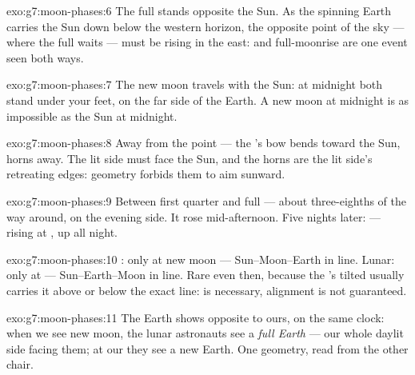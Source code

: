 \begin{solution}{exo:g7:moon-phases:6}
The full  stands opposite the Sun. As the spinning Earth
carries the Sun down below the western horizon, the opposite
point of the sky --- where the full  waits --- must be
rising in the east:  and full-moonrise are one event seen
both ways.
\end{solution}

\begin{solution}{exo:g7:moon-phases:7}
The new moon travels with the Sun: at midnight both stand under
your feet, on the far side of the Earth. A new moon at midnight
is as impossible as the Sun at midnight.
\end{solution}

\begin{solution}{exo:g7:moon-phases:8}
Away from the  point --- the 's bow bends toward
the Sun, horns away. The lit side must face the Sun, and the
horns are the lit side's retreating edges: geometry forbids them
to aim sunward.
\end{solution}

\begin{solution}{exo:g7:moon-phases:9}
Between first quarter and full --- about three-eighths of the
way around, on the evening side. It rose mid-afternoon. Five
nights later:  --- rising at , up all night.
\end{solution}

\begin{solution}{exo:g7:moon-phases:10}
: only at new moon --- Sun--Moon--Earth in line.
Lunar: only at  --- Sun--Earth--Moon in line. Rare even
then, because the 's tilted  usually carries it above
or below the exact line:  is necessary, alignment is not
guaranteed.
\end{solution}

\begin{solution}{exo:g7:moon-phases:11}
The Earth shows  opposite to ours, on the same clock:
when we see new moon, the lunar astronauts see a \emph{full
Earth} --- our whole daylit side facing them; at our 
they see a new Earth. One geometry, read from the other chair.
\end{solution}

